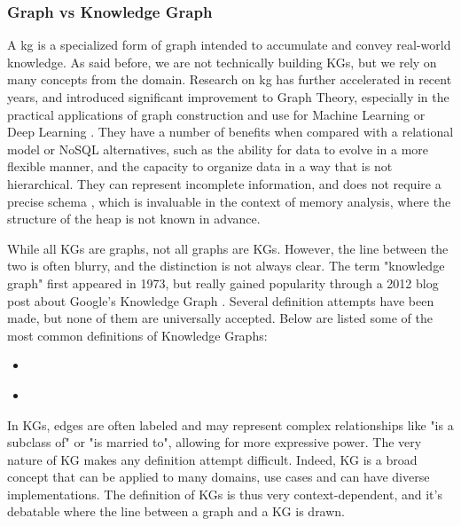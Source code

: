     \subsubsection{Graph vs Knowledge Graph}
    A \acrfull{kg} is a specialized form of graph intended to accumulate and convey real-world knowledge. As said before, we are not technically building KGs, but we rely on many concepts from the domain. Research on \acrshort{kg} has further accelerated in recent years, and introduced significant improvement to Graph Theory, especially in the practical applications of graph construction and use for Machine Learning or Deep Learning \cite{KG21}. They have a number of benefits when compared with a relational model or NoSQL alternatives, such as the ability for data to evolve in a more flexible manner, and the capacity to organize data in a way that is not hierarchical. They can represent incomplete information, and does not require a precise schema \cite[p.2]{KG21}, which is invaluable in the context of memory analysis, where the structure of the heap is not known in advance.

    While all KGs are graphs, not all graphs are KGs. However, the line between the two is often blurry, and the distinction is not always clear. The term "knowledge graph" first appeared in 1973, but really gained popularity through a 2012 blog post about Google's Knowledge Graph \cite{googleblog2023knowledgegraph}. Several definition attempts have been made, but none of them are universally accepted. Below are listed some of the most common definitions of Knowledge Graphs:
    \begin{itemize}
        \item {} \cite{KG21}
        \item {} \cite{CKG23}
    \end{itemize}
    
    In KGs, edges are often labeled and may represent complex relationships like "is a subclass of" or "is married to", allowing for more expressive power. The very nature of KG makes any definition attempt difficult. Indeed, KG is a broad concept that can be applied to many domains, use cases and can have diverse implementations. The definition of KGs is thus very context-dependent, and it's debatable where the line between a graph and a KG is drawn. 
    
